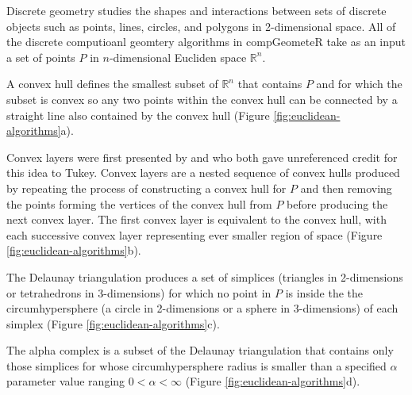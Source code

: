 \documentclass[12pt, a4paper]{article}
\begin{document}
Discrete geometry studies the shapes and interactions between sets of discrete objects such as points, lines, circles, and polygons in 2-dimensional space.  All of the discrete computioanl geomtery algorithms in compGeometeR take as an input a set of points $P$ in $n$-dimensional Eucliden space $\mathbb{R}^n$.

A convex hull defines the smallest subset of $\mathbb{R}^n$ that contains $P$ and for which the subset is convex so any two points within the convex hull can be connected by a straight line also contained by the convex hull (Figure \ref{fig:euclidean-algorithms}a).

Convex layers were first presented by \cite{huber-1972} and \cite{barnett-1976} who both gave unreferenced credit for this idea to Tukey.  Convex layers are a nested sequence of convex hulls produced by repeating the process of constructing a convex hull for $P$ and then removing the points forming the vertices of the convex hull from $P$ before producing the next convex layer.  The first convex layer is equivalent to the convex hull, with each successive convex layer representing ever smaller region of space (Figure \ref{fig:euclidean-algorithms}b).

The Delaunay triangulation \citep{delaunay-1934} produces a set of simplices (triangles in 2-dimensions or tetrahedrons in 3-dimensions) for which no point in $P$ is inside the the circumhypersphere (a circle in 2-dimensions or a sphere in 3-dimensions) of each simplex (Figure \ref{fig:euclidean-algorithms}c).

The alpha complex \citep{edelsbrunner-1994} is a subset of the Delaunay triangulation that contains only those simplices for whose circumhypersphere radius is smaller than a specified $\alpha$ parameter value ranging $0 < \alpha < \infty$ (Figure \ref{fig:euclidean-algorithms}d).
\end{document}
